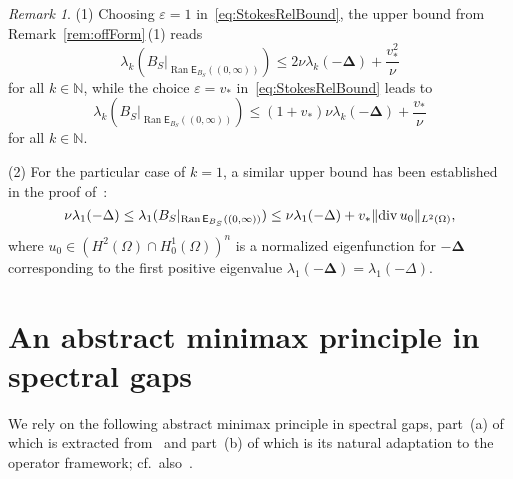 \documentclass[11pt,a4paper]{amsart}
\numberwithin{equation}{section}
\DeclareMathOperator{\Ran}{Ran}
\DeclareMathOperator{\divgc}{div}
\DeclarePairedDelimiter{\norm}{\lVert}{\rVert}
\newcommand{\eps}{\varepsilon}
\newcommand{\NN}{\mathbb{N}}
\newcommand{\EE}{\mathsf{E}}
\theoremstyle{plain}
\theoremstyle{definition}
\theoremstyle{remark}
\newtheorem{remark}[theorem]{Remark}
\begin{document}
\begin{remark}
  (1)
  Choosing $\eps = 1$ in~\eqref{eq:StokesRelBound}, the upper bound from Remark~\ref{rem:offForm}\,(1) reads
  \begin{equation*}
    \lambda_k(B_S|_{\Ran\EE_{B_S}((0,\infty))})
    \le
    2\nu\lambda_k(-\mathbf{\Delta}) + \frac{v_*^2}{\nu}
  \end{equation*}
  for all $k \in \NN$, while the choice $\eps = v_*$ in~\eqref{eq:StokesRelBound} leads to
  \begin{equation*}
    \lambda_k(B_S|_{\Ran\EE_{B_S}((0,\infty))})
    \le
    (1+v_*)\nu\lambda_k(-\mathbf{\Delta}) + \frac{v_*}{\nu}
  \end{equation*}
  for all $k \in \NN$.

  (2)
  For the particular case of $k = 1$, a similar upper bound has been established in the proof
  of~\cite[Theorem~2.1\,(i)]{GKMSV19}:
  \begin{equation*}
    \nu\lambda_1(-\Delta)
    \le
    \lambda_1(B_S|_{\Ran\EE_{B_S}((0,\infty))})
    \le
    \nu\lambda_1(-\Delta) + v_*\norm{\divgc u_0}_{L^2(\Omega)}
    ,
  \end{equation*}
  where $u_0 \in (H^2(\Omega) \cap H_0^1(\Omega))^n$ is a normalized eigenfunction for $-\mathbf{\Delta}$ corresponding to the
  first positive eigenvalue $\lambda_1(-\mathbf{\Delta}) = \lambda_1(-\Delta)$.
\end{remark}

\section{An abstract minimax principle in spectral gaps}\label{sec:abstrMinimax}

We rely on the following abstract minimax principle in spectral gaps, part~(a) of which is extracted from~\cite{GLS99} and
part~(b) of which is its natural adaptation to the operator framework; cf.~also~\cite[Proposition~A.3]{NSTTV18}.
\end{document}
